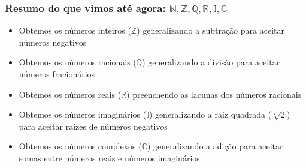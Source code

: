\documentclass[usenames,dvipsnames,svgnames]{beamer}
\begin{document}
\begin{frame}
	\frametitle{Resumo do que vimos até agora: $\mathbb{N}, \mathbb{Z}, \mathbb{Q}, \mathbb{R}, \mathbb{I}, \mathbb{C}$}

	\begin{itemize}
		\item Obtemos os números inteiros ($\mathbb{Z}$) generalizando a subtração para aceitar números negativos
		\item Obtemos os números racionais ($\mathbb{Q}$) generalizando a divisão para aceitar números fracionários
		\item Obtemos os números reais ($\mathbb{R}$) preenchendo as lacunas dos números racionais
		\item Obtemos os números imaginários ($\mathbb{I}$) generalizando a raiz quadrada ($\sqrt[2]{2}$) para aceitar raizes de números negativos
		\item Obtemos os números complexos ($\mathbb{C}$) generalizando a adição para aceitar somas entre números reais e números imaginários
	\end{itemize}

\end{frame}
\end{document}
